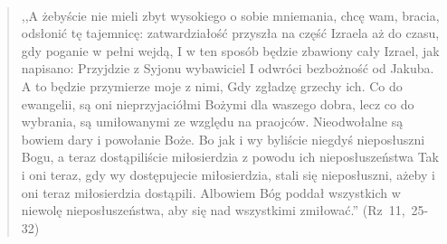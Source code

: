 \documentclass[10pt,a4paper,oneside]{article}
\begin{document}
\paragraph{}
\begin{quote}
,,A żebyście nie mieli zbyt wysokiego o sobie mniemania, chcę wam, bracia, odsłonić tę tajemnicę: zatwardziałość przyszła na część Izraela aż do czasu, gdy poganie w pełni wejdą, I w ten sposób będzie zbawiony cały Izrael, jak napisano: Przyjdzie z Syjonu wybawiciel I odwróci bezbożność od Jakuba. A to będzie przymierze moje z nimi, Gdy zgładzę grzechy ich. Co do ewangelii, są oni nieprzyjaciółmi Bożymi dla waszego dobra, lecz co do wybrania, są umiłowanymi ze względu na praojców. Nieodwołalne są bowiem dary i powołanie Boże. Bo jak i wy byliście niegdyś nieposłuszni Bogu, a teraz dostąpiliście miłosierdzia z powodu ich nieposłuszeństwa Tak i oni teraz, gdy wy dostępujecie miłosierdzia, stali się nieposłuszni, ażeby i oni teraz miłosierdzia dostąpili. Albowiem Bóg poddał wszystkich w niewolę nieposłuszeństwa, aby się nad wszystkimi zmiłować.'' \mbox{(Rz 11, 25-32)}
\end{quote}
\end{document}
